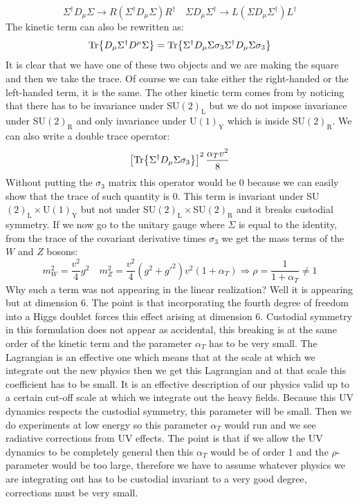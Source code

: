 \documentclass[../main.tex]{subfiles}
\begin{document}
\[
\Sigma^\dagger D_\mu\Sigma\to R(\Sigma^\dagger D_\mu\Sigma)R^\dagger \quad \Sigma D_\mu\Sigma^\dagger\to L(\Sigma D_\mu\Sigma^\dagger)L^\dagger
\]
The kinetic term can also be rewritten as:
\[
\Tr{D_\mu\Sigma^\dagger D^\mu\Sigma}=\Tr{\Sigma^\dagger D_\mu\Sigma\sigma_3\Sigma^\dagger D_\mu\Sigma\sigma_3}
\]
It is clear that we have one of these two objects and we are making the square and then we take the trace. Of course we can take either the right-handed or the left-handed term, it is the same. The other kinetic term comes from by noticing that there has to be invariance under SU$(2)_{\text{L}}$ but we do not impose invariance under SU$(2)_{\text{R}}$ and only invariance under U$(1)_{\text{Y}}$ which is inside SU$(2)_{\text{R}}$. We can also write a double trace operator:
\[
\left[\Tr{\Sigma^\dagger D_\mu\Sigma\sigma_3}\right]^2\frac{\alpha_Tv^2}{8}
\]
Without putting the $\sigma_3$ matrix this operator would be 0 because we can easily show that the trace of such quantity is 0. This term is invariant under SU$(2)_{\text{L}}\times$U$(1)_{\text{Y}}$ but not under SU$(2)_{\text{L}}\times$SU$(2)_{\text{R}}$ and it breaks custodial symmetry. If we now go to the unitary gauge where $\Sigma$ is equal to the identity, from the trace of the covariant derivative times $\sigma_3$ we get the mass terms of the $W$ and $Z$ bosons:
\[
m_W^2=\frac{v^2}{4}g^2 \quad m_Z^2=\frac{v^2}{4}(g^2+g'^2)v^2(1+\alpha_T)\Rightarrow\rho=\frac{1}{1+\alpha_T}\neq1
\]
Why such a term was not appearing in the linear realization? Well it is appearing but at dimension 6. The point is that incorporating the fourth degree of freedom into a Higgs doublet forces this effect arising at dimension 6. Custodial symmetry in this formulation does not appear as accidental, this breaking is at the same order of the kinetic term and the parameter $\alpha_T$ has to be very small. The Lagrangian is an effective one which means that at the scale at which we integrate out the new physics then we get this Lagrangian and at that scale this coefficient has to be small. It is an effective description of our physics valid up to a certain cut-off scale at which we integrate out the heavy fields. Because this UV dynamics respects the custodial symmetry, this parameter will be small. Then we do experiments at low energy so this parameter $\alpha_T$ would run and we see radiative corrections from UV effects. The point is that if we allow the UV dynamics to be completely general then this $\alpha_T$ would be of order 1 and the $\rho$-parameter would be too large, therefore we have to assume whatever physics we are integrating out has to be custodial invariant to a very good degree, corrections must be very small.\\
\end{document}
